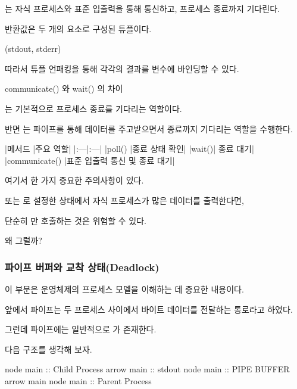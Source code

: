 는 자식 프로세스와 표준 입출력을 통해 통신하고, 프로세스 종료까지 기다린다.

반환값은 두 개의 요소로 구성된 튜플이다.

\begin{dhkzsh}
(stdout, stderr)
\end{dhkzsh}

따라서 튜플 언패킹을 통해 각각의 결과를 변수에 바인딩할 수 있다.

\begin{dhknote}
\begin{dhksmry}[centered]
communicate() 와 wait() 의 차이
\end{dhksmry}
\end{dhknote}

는 기본적으로 프로세스 종료를 기다리는 역할이다.

반면 는 파이프를 통해 데이터를 주고받으면서 종료까지 기다리는 역할을 수행한다.

\begin{dhktable}
|메서드	|주요 역할|
|:---|:---|
|poll()	|종료 상태 확인|
|wait()|	종료 대기|
|communicate()	|표준 입출력 통신 및 종료 대기|
\end{dhktable}

여기서 한 가지 중요한 주의사항이 있다.

 또는 로 설정한 상태에서 자식 프로세스가 많은 데이터를 출력한다면,

단순히 만 호출하는 것은 위험할 수 있다.

왜 그럴까?

\subsubsection{파이프 버퍼와 교착 상태(Deadlock)}

이 부분은 운영체제의 프로세스 모델을 이해하는 데 중요한 내용이다.

앞에서 파이프는 두 프로세스 사이에서 바이트 데이터를 전달하는 통로라고 하였다.

그런데 파이프에는 일반적으로 가 존재한다.

다음 구조를 생각해 보자.

\begin{dhkbranch}
node main :: Child Process
arrow main :: stdout
node main :: PIPE BUFFER
arrow main
node main :: Parent Process
\end{dhkbranch}

